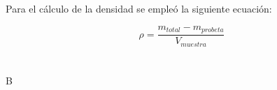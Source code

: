 \documentclass{replab}
\begin{document}
\printbibliography[heading=bibintoc]

{
\appendix
\section{}

Para el cálculo de la densidad se empleó la siguiente ecuación:

\begin{equation}
    \rho = \frac{m_{total} - m_{probeta}}{V_{muestra}}
\end{equation}

\section{}

B

}
\end{document}
